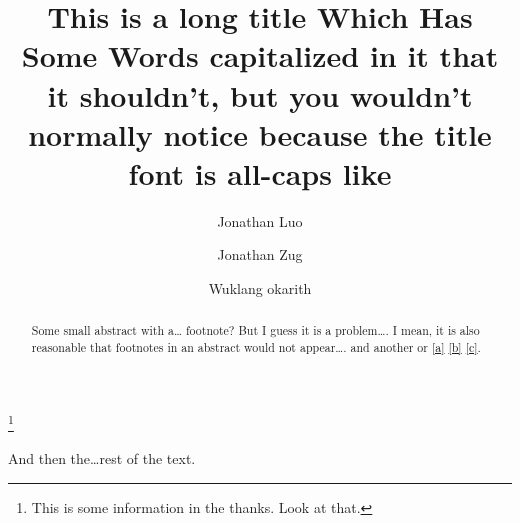 \documentclass{amsart}
\begin{document}
\title{This is a long title Which Has Some Words capitalized in it that it shouldn't, but you wouldn't normally notice because the title font is all-caps like}
\author{Jonathan Luo}
\address{Gorgeoso luiville and what is you deal; {\normalfont and} sure thing anyway}

\author{Jonathan Zug}
\address{ponderoso squatch and some other stuff, man}

\author{Wuklang okarith}
\address{ostensinobal quickdraw and the principle difference cluster}

\thanks{This is some information in the thanks. Look at that.}


\begin{abstract}
Some small %
abstract with a\dots{} footnote? But I guess it is a problem\dots. %
I mean,  it %
is also reasonable that footnotes in an abstract %
would not appear\dots. \cite{thing} and another \cite{thing} or \eqref{a} \eqref{b} \eqref{c}.
\end{abstract}

\maketitle

And %
then the\dots rest of the text.
\end{document}
